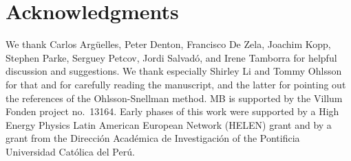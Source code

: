 \documentclass[final,5p,times,twocolumn]{elsarticle}
\begin{document}


\section*{Acknowledgments}

We thank Carlos Arg\"uelles, Peter Denton, Francisco De Zela, Joachim Kopp, Stephen Parke, Serguey Petcov, Jordi Salvad\'o, and Irene Tamborra for helpful discussion and suggestions.  We thank especially Shirley Li and Tommy Ohlsson for that and for carefully reading the manuscript, and the latter for pointing out the references of the Ohlsson-Snellman method.  MB is supported by the Villum Fonden project no.~13164.  Early phases of this work were supported by a High Energy Physics Latin American European Network (HELEN) grant and by a grant from the Direcci\'on Acad\'emica de Investigaci\'on of the Pontificia Universidad Cat\'olica del Per\'u. 

\newpage


% 
% 
\end{document}
